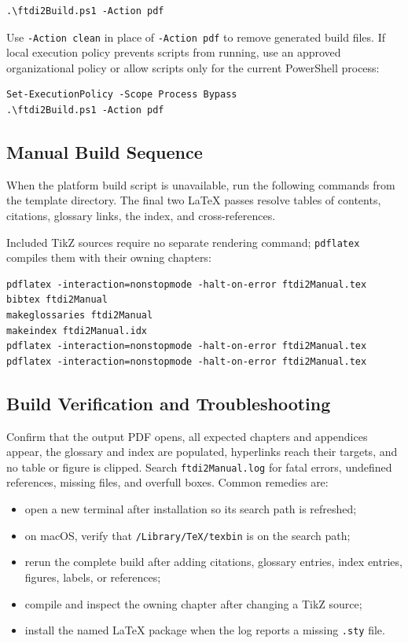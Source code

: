 \begin{verbatim}
.\ftdi2Build.ps1 -Action pdf
\end{verbatim}

Use \texttt{-Action clean} in place of \texttt{-Action pdf} to remove generated build files. If local execution policy prevents scripts from running, use an approved organizational policy or allow scripts only for the current PowerShell process:

\begin{verbatim}
Set-ExecutionPolicy -Scope Process Bypass
.\ftdi2Build.ps1 -Action pdf
\end{verbatim}

\subsection{Manual Build Sequence}

When the platform build script is unavailable, run the following commands from
the template directory. The final two LaTeX passes resolve tables of contents,
citations, glossary links, the index, and cross-references.

Included TikZ sources require no separate rendering command; \texttt{pdflatex}
compiles them with their owning chapters:

\begin{verbatim}
pdflatex -interaction=nonstopmode -halt-on-error ftdi2Manual.tex
bibtex ftdi2Manual
makeglossaries ftdi2Manual
makeindex ftdi2Manual.idx
pdflatex -interaction=nonstopmode -halt-on-error ftdi2Manual.tex
pdflatex -interaction=nonstopmode -halt-on-error ftdi2Manual.tex
\end{verbatim}

\subsection{Build Verification and Troubleshooting}

Confirm that the output PDF opens, all expected chapters and appendices appear,
the glossary and index are populated, hyperlinks reach their targets, and no
table or figure is clipped. Search \texttt{ftdi2Manual.log} for fatal errors,
undefined references, missing files, and overfull boxes. Common remedies are:

\begin{itemize}
\item open a new terminal after installation so its search path is refreshed;
\item on macOS, verify that \texttt{/Library/TeX/texbin} is on the search path;
\item rerun the complete build after adding citations, glossary entries, index
entries, figures, labels, or references;
\item compile and inspect the owning chapter after changing a TikZ source;
\item install the named LaTeX package when the log reports a missing
\texttt{.sty} file.
\end{itemize}

